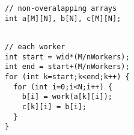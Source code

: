 \begin{lstlisting}[morekeywords={g_qCount},belowskip=0pt, firstnumber=1,
name=ver0]
// non-overalapping arrays
int a[M][N], b[N], c[M][N];
\end{lstlisting} 

\begin{lstlisting}[aboveskip=0pt,belowskip=0pt,backgroundcolor=\color{very-light-gray},
firstnumber=auto, name=ver0]

// each worker 
int start = wid*(M/nWorkers);
int end = start+(M/nWorkers);
for (int k=start;k<end;k++) {
  for (int i=0;i<N;i++) {
    b[i] = work(a[k][i]);
    c[k][i] = b[i];
  }
}
\end{lstlisting}
